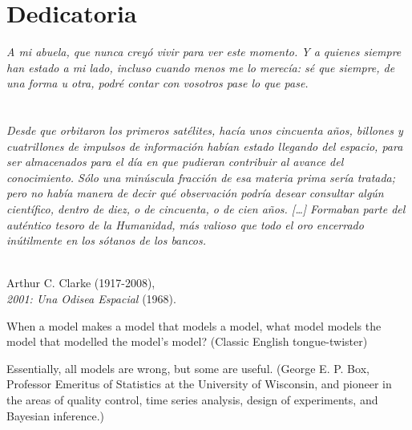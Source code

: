 \chapter*{Dedicatoria} %
\begin{adjustwidth}{0.6\columnwidth}{0cm}
	\begin{flushright}
		\emph{A mi abuela, que nunca creyó vivir para ver este momento. 
		Y a quienes siempre han estado a mi lado, incluso cuando menos 
		me lo merecía: sé que siempre, de una forma u otra, podré 
		contar con vosotros pase lo que pase.}
	\end{flushright}
\end{adjustwidth}

\cleardoublepage

\chapter*{ } %
\begin{adjustwidth}{0.15\columnwidth}{0.15\columnwidth}
	
	\emph{Desde que orbitaron los primeros satélites, hacía unos 
	cincuenta años, billones y cuatrillones de impulsos de información 
	habían estado llegando del espacio, para ser almacenados para el 
	día en que pudieran contribuir al avance del conocimiento. Sólo 
	una minúscula fracción de esa materia prima sería tratada; pero no 
	había manera de decir qué observación podría desear consultar algún 
	científico, dentro de diez, o de cincuenta, o de cien años. […] 
	Formaban parte del auténtico tesoro de la Humanidad, más valioso 
	que todo el oro encerrado inútilmente en los sótanos de los bancos.
	\\ \\}
	
	\begin{flushright}
		Arthur C. Clarke (1917-2008),\\ 
		\emph{2001: Una Odisea Espacial} (1968).
	\end{flushright}
\end{adjustwidth}

When a model makes a model that models a model, what model
models the model that modelled the model's model? (Classic
English tongue-twister)

 Essentially, all models are wrong, but some are useful. (George
E. P. Box, Professor Emeritus of Statistics at the University of
Wisconsin, and pioneer in the areas of quality control, time
series analysis, design of experiments, and Bayesian inference.)

